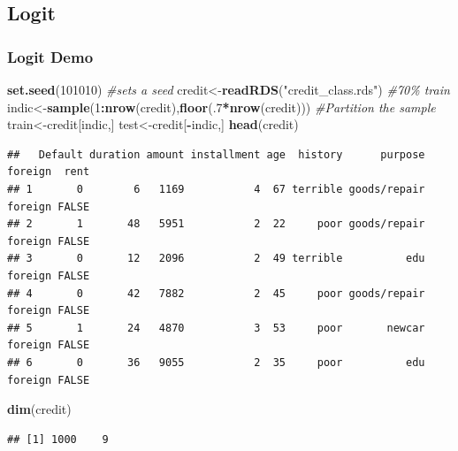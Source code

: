 \documentclass[
  shownotes,
  xcolor={svgnames},
  hyperref={colorlinks,citecolor=DarkBlue,linkcolor=DarkRed,urlcolor=DarkBlue}
  , aspectratio=169]{beamer}
\newenvironment{Shaded}{\begin{snugshade}}{\end{snugshade}}
\newcommand{\CommentTok}[1]{\textcolor[rgb]{0.56,0.35,0.01}{\textit{#1}}}
\newcommand{\DecValTok}[1]{\textcolor[rgb]{0.00,0.00,0.81}{#1}}
\newcommand{\KeywordTok}[1]{\textcolor[rgb]{0.13,0.29,0.53}{\textbf{#1}}}
\newcommand{\NormalTok}[1]{#1}
\newcommand{\OperatorTok}[1]{\textcolor[rgb]{0.81,0.36,0.00}{\textbf{#1}}}
\newcommand{\StringTok}[1]{\textcolor[rgb]{0.31,0.60,0.02}{#1}}
\begin{document}
\subsection{Logit}
\begin{frame}[fragile]
\frametitle{Logit Demo}

\begin{scriptsize}
\begin{Shaded}
\begin{Highlighting}[]
\KeywordTok{set.seed}\NormalTok{(}\DecValTok{101010}\NormalTok{) }\CommentTok{\#sets a seed }
\NormalTok{credit\textless{}{-}}\KeywordTok{readRDS}\NormalTok{(}\StringTok{"credit\_class.rds"}\NormalTok{)}
\CommentTok{\#70\% train}
\NormalTok{indic\textless{}{-}}\KeywordTok{sample}\NormalTok{(}\DecValTok{1}\OperatorTok{:}\KeywordTok{nrow}\NormalTok{(credit),}\KeywordTok{floor}\NormalTok{(.}\DecValTok{7}\OperatorTok{*}\KeywordTok{nrow}\NormalTok{(credit)))}
\CommentTok{\#Partition the sample}
\NormalTok{train\textless{}{-}credit[indic,]}
\NormalTok{test\textless{}{-}credit[}\OperatorTok{{-}}\NormalTok{indic,]}
\KeywordTok{head}\NormalTok{(credit)}
\end{Highlighting}
\end{Shaded}
\end{scriptsize}
\begin{tiny}
\begin{verbatim}
##   Default duration amount installment age  history      purpose foreign  rent
## 1       0        6   1169           4  67 terrible goods/repair foreign FALSE
## 2       1       48   5951           2  22     poor goods/repair foreign FALSE
## 3       0       12   2096           2  49 terrible          edu foreign FALSE
## 4       0       42   7882           2  45     poor goods/repair foreign FALSE
## 5       1       24   4870           3  53     poor       newcar foreign FALSE
## 6       0       36   9055           2  35     poor          edu foreign FALSE
\end{verbatim}
\end{tiny}
\begin{scriptsize}


\begin{Shaded}
\begin{Highlighting}[]
\KeywordTok{dim}\NormalTok{(credit)}
\end{Highlighting}
\end{Shaded}
\end{scriptsize}
\begin{tiny}
\begin{verbatim}
## [1] 1000    9
\end{verbatim}
\end{tiny}


\end{frame}
\end{document}
